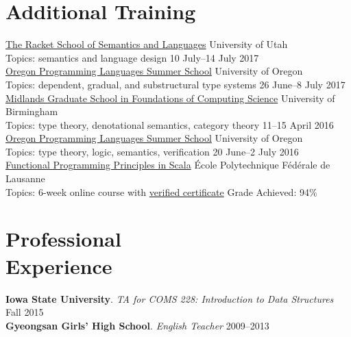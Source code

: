 \documentclass[margin,line]{resume}
\begin{document}
\begin{resume}
      

\section{\mysidestyle Additional Training}

\newcommand\ssitem[5]{\href{#1}{#2} \hfill #3 \\ Topics: #4 \hfill #5}

\ssitem
{https://summer-school.racket-lang.org/2017/}
{The Racket School of Semantics and Languages}
{University of Utah}
{semantics and language design}
{10 July--14 July 2017}\\[\mymedskip]
\ssitem
{https://www.cs.uoregon.edu/research/summerschool/summer17}
{Oregon Programming Languages Summer School}
{University of Oregon}
{dependent, gradual, and substructural type systems}
{26 June--8 July 2017}\\[\mymedskip]
\ssitem
{http://www.cs.bham.ac.uk/~pbl/mgs2016/}
{Midlands Graduate School in Foundations of Computing Science}
{University of Birmingham}
{type theory, denotational semantics, category theory}
{11--15 April 2016}\\[\mymedskip]
\ssitem
{https://www.cs.uoregon.edu/research/summerschool/summer16/}
{Oregon Programming Languages Summer School}
{University of Oregon}
{type theory, logic, semantics, verification}
{20 June--2 July 2016}\\[\mymedskip]
\ssitem
{https://www.coursera.org/learn/progfun1}
{Functional Programming Principles in Scala}
{\'{E}cole Polytechnique F\'{e}d\'{e}rale de Lausanne}
{6-week online course with
\href{https://www.coursera.org/account/accomplishments/records/SRLRBNFMFW86}
     {verified certificate}}
{Grade Achieved: 94\%}

\section{\mysidestyle Professional\\Experience}
\textbf{Iowa State University}.  \textsl{TA for {\small COMS} 228: Introduction to Data Structures} \hfill Fall 2015\\[\mysmallskip]
\textbf{Gyeongsan Girls' High School}. \textsl{English Teacher}  \hfill 2009--2013


\end{resume}
\end{document}
